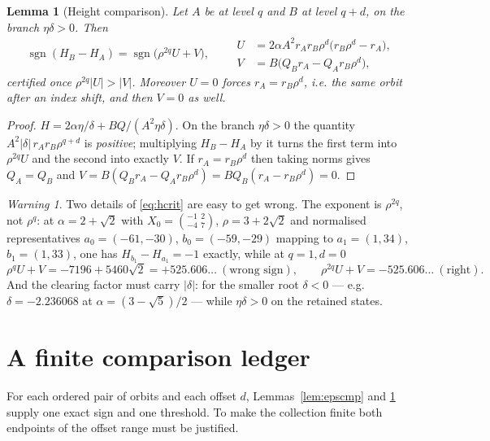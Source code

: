 \documentclass[11pt]{article}
\newtheorem{lemma}[theorem]{Lemma}
\theoremstyle{definition}
\theoremstyle{remark}
\newtheorem{warning}[theorem]{Warning}
\newcommand{\dd}{\delta}
\newcommand{\sgn}{\operatorname{sgn}}
\begin{document}
\begin{lemma}[Height comparison]\label{lem:hcmp}
Let $A$ be at level $q$ and $B$ at level $q+d$, on the branch $\eta\dd>0$. Then
\begin{equation}\label{eq:hcrit}
\sgn(H_B-H_A)=\sgn\bigl(\rho^{2q}U+V\bigr),\qquad
\begin{aligned}
U&=2\alpha A^2r_Ar_B\rho^{d}\bigl(r_B\rho^{d}-r_A\bigr),\\
V&=B\bigl(Q_Br_A-Q_Ar_B\rho^{d}\bigr),
\end{aligned}
\end{equation}
certified once $\rho^{2q}|U|>|V|$. Moreover $U=0$ forces $r_A=r_B\rho^{d}$, i.e. the same orbit
after an index shift, and then $V=0$ as well.
\end{lemma}

\begin{proof}
$H=2\alpha\eta/\dd+BQ/(A^2\eta\dd)$. On the branch $\eta\dd>0$ the quantity
$A^2|\dd|\,r_Ar_B\rho^{q+d}$ is \emph{positive}; multiplying $H_B-H_A$ by it turns the first
term into $\rho^{2q}U$ and the second into exactly $V$. If $r_A=r_B\rho^d$ then taking norms
gives $Q_A=Q_B$ and $V=B(Q_Br_A-Q_Ar_B\rho^d)=BQ_B(r_A-r_B\rho^d)=0$.
\end{proof}

\begin{warning}\label{warn:hsign}
Two details of \eqref{eq:hcrit} are easy to get wrong. The exponent is $\rho^{2q}$, not
$\rho^{q}$: at $\alpha=2+\sqrt2$ with $X_0=\binom{-1\ \ 2}{-4\ \ 7}$, $\rho=3+2\sqrt2$ and
normalised representatives $a_0=(-61,-30)$, $b_0=(-59,-29)$ mapping to $a_1=(1,34)$,
$b_1=(1,33)$, one has $H_{b_1}-H_{a_1}=-1$ exactly, while at $q=1,d=0$
\[
\rho^{q}U+V=-7196+5460\sqrt2=+525.606\ldots\ (\text{wrong sign}),\qquad
\rho^{2q}U+V=-525.606\ldots\ (\text{right}).
\]
And the clearing factor must carry $|\dd|$: for the smaller root $\dd<0$ --- e.g.
$\dd=-2.236068$ at $\alpha=(3-\sqrt5)/2$ --- while $\eta\dd>0$ on the retained states.
\end{warning}

\section{A finite comparison ledger}\label{sec:ledger}

For each ordered pair of orbits and each offset $d$, Lemmas~\ref{lem:epscmp} and \ref{lem:hcmp}
supply one exact sign and one threshold. To make the collection finite both endpoints of the
offset range must be justified.
\end{document}
